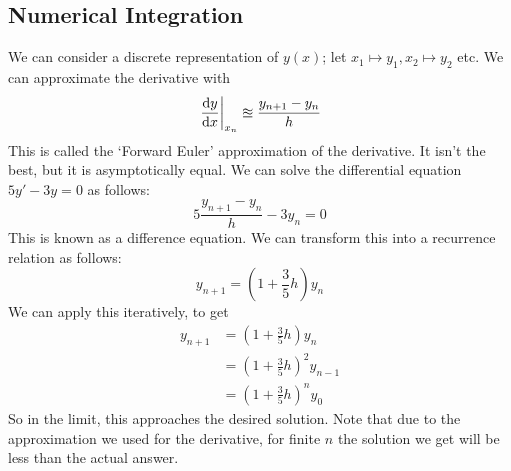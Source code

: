 \documentclass{article}
\begin{document}
\subsection{Numerical Integration}
We can consider a discrete representation of $y(x)$; let $x_1 \mapsto y_1, x_2 \mapsto y_2$ etc. We can approximate the derivative with
\[ \eval{\frac{\dd{y}}{\dd{x}}}_{x_n} \approxeq \frac{y_{n+1} - y_n}{h} \]
This is called the `Forward Euler' approximation of the derivative. It isn't the best, but it is asymptotically equal. We can solve the differential equation $5y' - 3y = 0$ as follows:
\[ 5 \frac{y_{n+1} - y_n}{h} - 3y_n = 0 \]
This is known as a difference equation. We can transform this into a recurrence relation as follows:
\[ y_{n+1} = \left( 1 + \frac{3}{5}h \right) y_n \]
We can apply this iteratively, to get
\begin{align*}
    y_{n+1} & = \left( 1 + \frac{3}{5}h \right) y_n       \\
            & = \left( 1 + \frac{3}{5}h \right)^2 y_{n-1} \\
            & = \left( 1 + \frac{3}{5}h \right)^n y_{0}
\end{align*}
So in the limit, this approaches the desired solution. Note that due to the approximation we used for the derivative, for finite $n$ the solution we get will be less than the actual answer.
\end{document}
